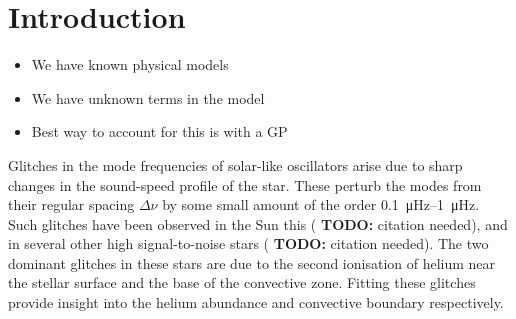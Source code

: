 \documentclass[linenumbers,modern,astrosymb,times]{aastex631}
\newcommand{\todo}[1]{{\color{todo} \textbf{TODO:} #1}}
\newcommand{\needcite}{\todo{citation needed}}
\begin{document}

\section{Introduction}\label{sec:intro}

\begin{itemize}
    \item We have known physical models
    \item We have unknown terms in the model
    \item Best way to account for this is with a GP
\end{itemize}

Glitches in the mode frequencies of solar-like oscillators arise due to sharp
changes in the sound-speed profile of the star. These perturb the modes from
their regular spacing \(\Delta\nu\) by some small amount of the order
\SIrange{0.1}{1}{\micro\Hz}. Such glitches have been observed in the Sun this (\needcite),
and in several other high signal-to-noise stars (\needcite). The two dominant
glitches in these stars are due to the second ionisation of helium near the
stellar surface and the base of the convective zone. Fitting these
glitches provide insight into the helium abundance and convective boundary
respectively.
\end{document}
